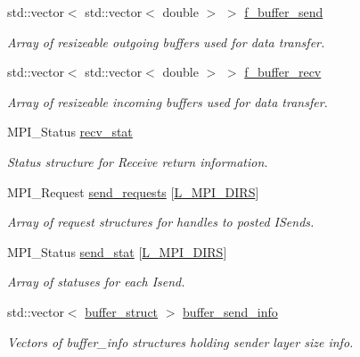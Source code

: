 \begin{DoxyCompactItemize}
std\+::vector$<$ std\+::vector$<$ double $>$ $>$ \hyperlink{class_mpi_manager_aafbb74832f69a915927b9bf252bd971d}{f\+\_\+buffer\+\_\+send}
\begin{DoxyCompactList}\small\item\em Array of resizeable outgoing buffers used for data transfer. \end{DoxyCompactList}\item 
std\+::vector$<$ std\+::vector$<$ double $>$ $>$ \hyperlink{class_mpi_manager_ab8f1eeab50fd4812b3a51af1a6c43713}{f\+\_\+buffer\+\_\+recv}
\begin{DoxyCompactList}\small\item\em Array of resizeable incoming buffers used for data transfer. \end{DoxyCompactList}\item 
M\+P\+I\+\_\+\+Status \hyperlink{class_mpi_manager_a257bc27e8099f1cbf5ac70b80d8eadaa}{recv\+\_\+stat}
\begin{DoxyCompactList}\small\item\em Status structure for Receive return information. \end{DoxyCompactList}\item 
M\+P\+I\+\_\+\+Request \hyperlink{class_mpi_manager_ae4ba6735840e949dff5cd63ab1695ff0}{send\+\_\+requests} \mbox{[}\hyperlink{definitions_8h_a144328eed4e90ebcf8a9f66aa7337266}{L\+\_\+\+M\+P\+I\+\_\+\+D\+I\+RS}\mbox{]}
\begin{DoxyCompactList}\small\item\em Array of request structures for handles to posted I\+Sends. \end{DoxyCompactList}\item 
M\+P\+I\+\_\+\+Status \hyperlink{class_mpi_manager_a3ccb49ceda719f0c6bb90593a880a730}{send\+\_\+stat} \mbox{[}\hyperlink{definitions_8h_a144328eed4e90ebcf8a9f66aa7337266}{L\+\_\+\+M\+P\+I\+\_\+\+D\+I\+RS}\mbox{]}
\begin{DoxyCompactList}\small\item\em Array of statuses for each Isend. \end{DoxyCompactList}\item 
std\+::vector$<$ \hyperlink{struct_mpi_manager_1_1buffer__struct}{buffer\+\_\+struct} $>$ \hyperlink{class_mpi_manager_a3a91c2e8cfb15027a0681c198f82d257}{buffer\+\_\+send\+\_\+info}
\begin{DoxyCompactList}\small\item\em Vectors of buffer\+\_\+info structures holding sender layer size info. \end{DoxyCompactList}\item 

\end{DoxyCompactItemize}
